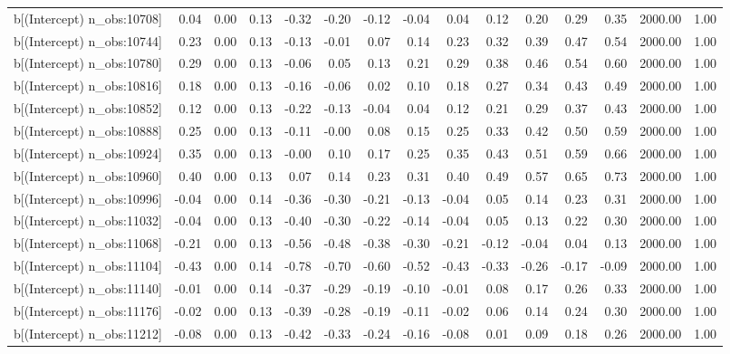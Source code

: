 \begin{table}[ht]
\begin{tabular}{rrrrrrrrrrrrrrr}
  b[(Intercept) n\_obs:10708] & 0.04 & 0.00 & 0.13 & -0.32 & -0.20 & -0.12 & -0.04 & 0.04 & 0.12 & 0.20 & 0.29 & 0.35 & 2000.00 & 1.00 \\ 
  b[(Intercept) n\_obs:10744] & 0.23 & 0.00 & 0.13 & -0.13 & -0.01 & 0.07 & 0.14 & 0.23 & 0.32 & 0.39 & 0.47 & 0.54 & 2000.00 & 1.00 \\ 
  b[(Intercept) n\_obs:10780] & 0.29 & 0.00 & 0.13 & -0.06 & 0.05 & 0.13 & 0.21 & 0.29 & 0.38 & 0.46 & 0.54 & 0.60 & 2000.00 & 1.00 \\ 
  b[(Intercept) n\_obs:10816] & 0.18 & 0.00 & 0.13 & -0.16 & -0.06 & 0.02 & 0.10 & 0.18 & 0.27 & 0.34 & 0.43 & 0.49 & 2000.00 & 1.00 \\ 
  b[(Intercept) n\_obs:10852] & 0.12 & 0.00 & 0.13 & -0.22 & -0.13 & -0.04 & 0.04 & 0.12 & 0.21 & 0.29 & 0.37 & 0.43 & 2000.00 & 1.00 \\ 
  b[(Intercept) n\_obs:10888] & 0.25 & 0.00 & 0.13 & -0.11 & -0.00 & 0.08 & 0.15 & 0.25 & 0.33 & 0.42 & 0.50 & 0.59 & 2000.00 & 1.00 \\ 
  b[(Intercept) n\_obs:10924] & 0.35 & 0.00 & 0.13 & -0.00 & 0.10 & 0.17 & 0.25 & 0.35 & 0.43 & 0.51 & 0.59 & 0.66 & 2000.00 & 1.00 \\ 
  b[(Intercept) n\_obs:10960] & 0.40 & 0.00 & 0.13 & 0.07 & 0.14 & 0.23 & 0.31 & 0.40 & 0.49 & 0.57 & 0.65 & 0.73 & 2000.00 & 1.00 \\ 
  b[(Intercept) n\_obs:10996] & -0.04 & 0.00 & 0.14 & -0.36 & -0.30 & -0.21 & -0.13 & -0.04 & 0.05 & 0.14 & 0.23 & 0.31 & 2000.00 & 1.00 \\ 
  b[(Intercept) n\_obs:11032] & -0.04 & 0.00 & 0.13 & -0.40 & -0.30 & -0.22 & -0.14 & -0.04 & 0.05 & 0.13 & 0.22 & 0.30 & 2000.00 & 1.00 \\ 
  b[(Intercept) n\_obs:11068] & -0.21 & 0.00 & 0.13 & -0.56 & -0.48 & -0.38 & -0.30 & -0.21 & -0.12 & -0.04 & 0.04 & 0.13 & 2000.00 & 1.00 \\ 
  b[(Intercept) n\_obs:11104] & -0.43 & 0.00 & 0.14 & -0.78 & -0.70 & -0.60 & -0.52 & -0.43 & -0.33 & -0.26 & -0.17 & -0.09 & 2000.00 & 1.00 \\ 
  b[(Intercept) n\_obs:11140] & -0.01 & 0.00 & 0.14 & -0.37 & -0.29 & -0.19 & -0.10 & -0.01 & 0.08 & 0.17 & 0.26 & 0.33 & 2000.00 & 1.00 \\ 
  b[(Intercept) n\_obs:11176] & -0.02 & 0.00 & 0.13 & -0.39 & -0.28 & -0.19 & -0.11 & -0.02 & 0.06 & 0.14 & 0.24 & 0.30 & 2000.00 & 1.00 \\ 
  b[(Intercept) n\_obs:11212] & -0.08 & 0.00 & 0.13 & -0.42 & -0.33 & -0.24 & -0.16 & -0.08 & 0.01 & 0.09 & 0.18 & 0.26 & 2000.00 & 1.00 \\ 

\end{tabular}
\end{table}
